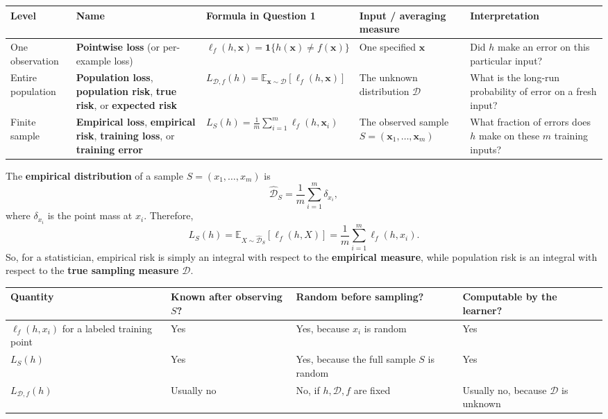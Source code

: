 \documentclass[11pt,a4paper]{article}
\theoremstyle{definition}
\begin{document}
{\small
\begin{center}
\begin{tabularx}{\textwidth}{|l|X|X|X|X|}
    \hline
    \textbf{Level} 
    & \textbf{Name} 
    & \textbf{Formula in Question 1} 
    & \textbf{Input / averaging measure} 
    & \textbf{Interpretation} 
    \\ \hline

    One observation 
    & \textbf{Pointwise loss} (or per-example loss) 
    & $\ell_f(h, \boldsymbol{x}) = \mathbf{1}\{h(\boldsymbol{x}) \neq f(\boldsymbol{x})\}$ 
    & One specified $\boldsymbol{x}$ 
    & Did $h$ make an error on this particular input? 
    \\ \hline

    Entire population 
    & \textbf{Population loss}, \textbf{population risk}, \textbf{true risk}, or \textbf{expected risk} 
    & $L_{\mathcal{D},f}(h) = \mathbb{E}_{\boldsymbol{x} \sim \mathcal{D}}[\ell_f(h, \boldsymbol{x})]$ 
    & The unknown distribution $\mathcal{D}$ 
    & What is the long-run probability of error on a fresh input? 
    \\ \hline

    Finite sample 
    & \textbf{Empirical loss}, \textbf{empirical risk}, \textbf{training loss}, or \textbf{training error} 
    & $L_S(h) = \frac{1}{m} \sum_{i=1}^m \ell_f(h, \boldsymbol{x}_i)$ 
    & The observed sample $S = (\boldsymbol{x}_1, \dots, \boldsymbol{x}_m)$ 
    & What fraction of errors does $h$ make on these $m$ training inputs? 
    \\ \hline
\end{tabularx}
\end{center}
}
The \textbf{empirical distribution} of a sample $S = (x_1, \dots, x_m)$ is
\[
\widehat{\mathcal{D}}_S = \frac{1}{m} \sum_{i=1}^m \delta_{x_i},
\]
where $\delta_{x_i}$ is the point mass at $x_i$. Therefore,
\[
L_S(h) = \mathbb{E}_{X \sim \widehat{\mathcal{D}}_S}[\ell_f(h, X)] = \frac{1}{m} \sum_{i=1}^m \ell_f(h, x_i).
\]
So, for a statistician, empirical risk is simply an integral with respect to the \textbf{empirical measure}, while population risk is an integral with respect to the \textbf{true sampling measure} $\mathcal{D}$.


{\small
\begin{center}
\begin{tabularx}{\textwidth}{|l|X|X|X|}
    \hline
    \textbf{Quantity} & \textbf{Known after observing $S$?} & \textbf{Random before sampling?} & \textbf{Computable by the learner?} \\ \hline
    $\ell_f(h, x_i)$ for a labeled training point & Yes & Yes, because $x_i$ is random & Yes \\ \hline
    $L_S(h)$ & Yes & Yes, because the full sample $S$ is random & Yes \\ \hline
    $L_{\mathcal{D},f}(h)$ & Usually no & No, if $h, \mathcal{D}, f$ are fixed & Usually no, because $\mathcal{D}$ is unknown \\ \hline
\end{tabularx}
\end{center}
}
\end{document}

